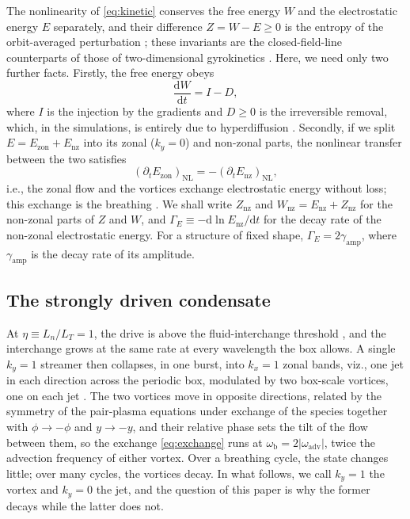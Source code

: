 \documentclass{jpp}
\newcommand{\rmd}{\text{d}}
\newcommand{\pt}{\partial_t}
\newcommand{\Enz}{E_\text{nz}}
\newcommand{\Ezon}{E_\text{zon}}
\newcommand{\Znz}{Z_\text{nz}}
\newcommand{\Wnz}{W_\text{nz}}
\newcommand{\GammaE}{\Gamma_{\!E}}
\newcommand{\gammaamp}{\gamma_\text{amp}}
\newcommand{\omb}{\omega_\text{b}}
\begin{document}
The nonlinearity of \cref{eq:kinetic} conserves the free energy \(W\) and the electrostatic energy \(E\) separately, and their difference \(Z = W - E \geq 0\) is the entropy of the orbit-averaged perturbation \citep{KennedyPlunkManuscript, KennedyPlunkLetter}; these invariants are the closed-field-line counterparts of those of two-dimensional gyrokinetics \citep{Plunk2010, PlunkTatsuno2011}. Here, we need only two further facts. Firstly, the free energy obeys
\begin{equation}
\frac{\rmd W}{\rmd t} = I - D,
\label{eq:balance}
\end{equation}
where \(I\) is the injection by the gradients and \(D \geq 0\) is the irreversible removal, which, in the simulations, is entirely due to hyperdiffusion \citep{KrommesHu1994, Sugama1996}. Secondly, if we split \(E = \Ezon + \Enz\) into its zonal (\(k_y = 0\)) and non-zonal parts, the nonlinear transfer between the two satisfies
\begin{equation}
\left(\pt\Ezon\right)_\text{NL} = -\left(\pt\Enz\right)_\text{NL},
\label{eq:exchange}
\end{equation}
i.e., the zonal flow and the vortices exchange electrostatic energy without loss; this exchange is the breathing \citep{KennedyPlunkLetter}. We shall write \(\Znz\) and \(\Wnz = \Enz + \Znz\) for the non-zonal parts of \(Z\) and \(W\), and \(\GammaE \equiv -\rmd\ln\Enz/\rmd t\) for the decay rate of the non-zonal electrostatic energy. For a structure of fixed shape, \(\GammaE = 2\gammaamp\), where \(\gammaamp\) is the decay rate of its amplitude.

\subsection{The strongly driven condensate}\label{sec:condensate}

At \(\eta \equiv L_n/L_T = 1\), the drive is above the fluid-interchange threshold \citep{MPH2018}, and the interchange grows at the same rate at every wavelength the box allows. A single \(k_y = 1\) streamer then collapses, in one burst, into \(k_x = 1\) zonal bands, viz., one jet in each direction across the periodic box, modulated by two box-scale vortices, one on each jet \citep{KennedyPlunkLetter}. The two vortices move in opposite directions, related by the symmetry of the pair-plasma equations under exchange of the species together with \(\phi\to-\phi\) and \(y\to-y\), and their relative phase sets the tilt of the flow between them, so the exchange \cref{eq:exchange} runs at \(\omb = 2|\omega_\text{adv}|\), twice the advection frequency of either vortex. Over a breathing cycle, the state changes little; over many cycles, the vortices decay. In what follows, we call \(k_y = 1\) the vortex and \(k_y = 0\) the jet, and the question of this paper is why the former decays while the latter does not.
\end{document}
